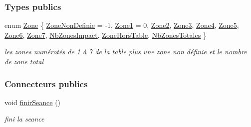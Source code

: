 \subsubsection*{Types publics}
\begin{DoxyCompactItemize}
\item 
enum \hyperlink{class_statistiques_seance_aa839f5192cbadd7c3fb3651d62eff8b5}{Zone} \{ \newline
\hyperlink{class_statistiques_seance_aa839f5192cbadd7c3fb3651d62eff8b5afaee4b0051f413cbba9651905daeba28}{Zone\+Non\+Definie} = -\/1, 
\hyperlink{class_statistiques_seance_aa839f5192cbadd7c3fb3651d62eff8b5a3aa1c8dd53092c489bf5b27952c898ac}{Zone1} = 0, 
\hyperlink{class_statistiques_seance_aa839f5192cbadd7c3fb3651d62eff8b5acf74b44f34352af881c12d4fb4698727}{Zone2}, 
\hyperlink{class_statistiques_seance_aa839f5192cbadd7c3fb3651d62eff8b5acdc3da6ca403f3a4ae3e11a10e7d9bbb}{Zone3}, 
\newline
\hyperlink{class_statistiques_seance_aa839f5192cbadd7c3fb3651d62eff8b5abbf773e4fc35c934fee03e377f89e84c}{Zone4}, 
\hyperlink{class_statistiques_seance_aa839f5192cbadd7c3fb3651d62eff8b5a0ed753df79f18c07d46dfc3afeb8a344}{Zone5}, 
\hyperlink{class_statistiques_seance_aa839f5192cbadd7c3fb3651d62eff8b5a012027bd30be4ea847690179ba948343}{Zone6}, 
\hyperlink{class_statistiques_seance_aa839f5192cbadd7c3fb3651d62eff8b5a196adb885d7fd7109e451e759564ea64}{Zone7}, 
\newline
\hyperlink{class_statistiques_seance_aa839f5192cbadd7c3fb3651d62eff8b5a4623fc9051358f3d82fdccd5047d3736}{Nb\+Zones\+Impact}, 
\hyperlink{class_statistiques_seance_aa839f5192cbadd7c3fb3651d62eff8b5aeb6ef225df9153e1f46a968ae71bf2f3}{Zone\+Hors\+Table}, 
\hyperlink{class_statistiques_seance_aa839f5192cbadd7c3fb3651d62eff8b5afe19f73563963b5160847cdd8c2260c4}{Nb\+Zones\+Totales}
 \}\begin{DoxyCompactList}\small\item\em les zones numérotés de 1 à 7 de la table plus une zone non définie et le nombre de zone total \end{DoxyCompactList}
\end{DoxyCompactItemize}
\subsubsection*{Connecteurs publics}
\begin{DoxyCompactItemize}
\item 
void \hyperlink{class_statistiques_seance_a72526ea18d6c534a1cb84576ef3ea28d}{finir\+Seance} ()
\begin{DoxyCompactList}\small\item\em fini la seance \end{DoxyCompactList}\end{DoxyCompactItemize}
